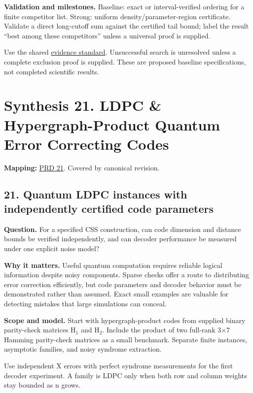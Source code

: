 \documentclass[
  11pt,
]{article}
\begin{document}
\textbf{Validation and milestones.} Baseline: exact or interval-verified
ordering for a finite competitor list. Strong: uniform
density/parameter-region certificate. Validate a direct long-cutoff sum
against the certified tail bound; label the result ``best among these
competitors'' unless a universal proof is supplied.

Use the shared
\href{https://github.com/rick-stevens-ai/Pure-Thought/blob/main/reviews/EVIDENCE-STANDARD.md}{evidence
standard}. Unsuccessful search is unresolved unless a complete exclusion
proof is supplied. These are proposed baseline specifications, not
completed scientific results.

\section{Synthesis 21. LDPC \& Hypergraph-Product Quantum Error
Correcting Codes}

\textbf{Mapping:}
\href{https://github.com/rick-stevens-ai/Pure-Thought/blob/main/PRDs/21-Quantum-LDPC-Codes.md}{PRD
21}. Covered by canonical revision.

\subsection{21. Quantum LDPC instances with independently certified code
parameters}

\textbf{Question.} For a specified CSS construction, can code dimension
and distance bounds be verified independently, and can decoder
performance be measured under one explicit noise model?

\textbf{Why it matters.} Useful quantum computation requires reliable
logical information despite noisy components. Sparse checks offer a
route to distributing error correction efficiently, but code parameters
and decoder behavior must be demonstrated rather than assumed. Exact
small examples are valuable for detecting mistakes that large
simulations can conceal.

\textbf{Scope and model.} Start with hypergraph-product codes from
supplied binary parity-check matrices H\ensuremath{{}_{1}} and
H\ensuremath{{}_{2}}. Include the product of two full-rank
3\ensuremath{\times}7 Hamming parity-check matrices as a small
benchmark. Separate finite instances, asymptotic families, and noisy
syndrome extraction.

Use independent X errors with perfect syndrome measurements for the
first decoder experiment. A family is LDPC only when both row and column
weights stay bounded as n grows.
\end{document}
